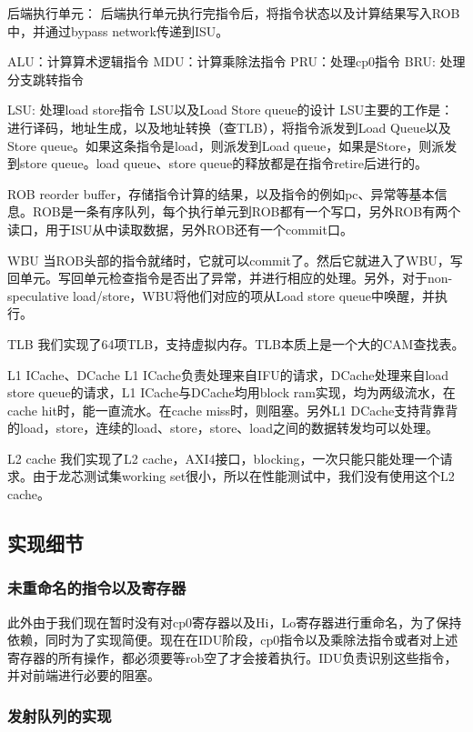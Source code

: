 \documentclass[lang=cn,11pt,a4paper]{elegantpaper}
\begin{document}
后端执行单元：
后端执行单元执行完指令后，将指令状态以及计算结果写入ROB中，并通过bypass network传递到ISU。

ALU：计算算术逻辑指令
MDU：计算乘除法指令
PRU：处理cp0指令
BRU: 处理分支跳转指令

LSU: 处理load store指令
LSU以及Load Store queue的设计
LSU主要的工作是：
进行译码，地址生成，以及地址转换（查TLB），将指令派发到Load Queue以及Store queue。如果这条指令是load，则派发到Load queue，如果是Store，则派发到store queue。load queue、store queue的释放都是在指令retire后进行的。

ROB
reorder buffer，存储指令计算的结果，以及指令的例如pc、异常等基本信息。ROB是一条有序队列，每个执行单元到ROB都有一个写口，另外ROB有两个读口，用于ISU从中读取数据，另外ROB还有一个commit口。

WBU
当ROB头部的指令就绪时，它就可以commit了。然后它就进入了WBU，写回单元。写回单元检查指令是否出了异常，并进行相应的处理。另外，对于non-speculative load/store，WBU将他们对应的项从Load store queue中唤醒，并执行。

TLB
我们实现了64项TLB，支持虚拟内存。TLB本质上是一个大的CAM查找表。

L1 ICache、DCache
L1 ICache负责处理来自IFU的请求，DCache处理来自load store queue的请求，L1 ICache与DCache均用block ram实现，均为两级流水，在cache hit时，能一直流水。在cache miss时，则阻塞。另外L1 DCache支持背靠背的load，store，连续的load、store，store、load之间的数据转发均可以处理。

L2 cache
我们实现了L2 cache，AXI4接口，blocking，一次只能只能处理一个请求。由于龙芯测试集working set很小，所以在性能测试中，我们没有使用这个L2 cache。

\subsection{实现细节}

\subsubsection{未重命名的指令以及寄存器}

此外由于我们现在暂时没有对cp0寄存器以及Hi，Lo寄存器进行重命名，为了保持依赖，同时为了实现简便。现在在IDU阶段，cp0指令以及乘除法指令或者对上述寄存器的所有操作，都必须要等rob空了才会接着执行。IDU负责识别这些指令，并对前端进行必要的阻塞。

\subsubsection{发射队列的实现}
\end{document}
